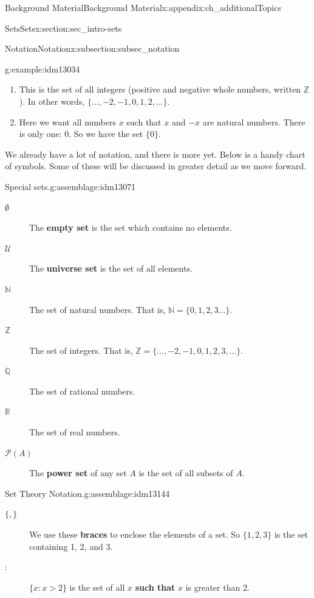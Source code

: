 \documentclass[oneside,10pt,]{book}
\newcommand{\terminology}[1]{\textbf{#1}}
\numberwithin{equation}{chapter}
\def\N{\mathbb N}
\def\Z{\mathbb Z}
\def\Q{\mathbb Q}
\def\R{\mathbb R}
\def\U{\mathcal U}
\def\pow{\mathcal P}
\def\st{:}
\begin{document}
\begin{appendixptx}{Background Material}{}{Background Material}{}{}{x:appendix:ch_additionalTopics}
\begin{sectionptx}{Sets}{}{Sets}{}{}{x:section:sec_intro-sets}
\begin{subsectionptx}{Notation}{}{Notation}{}{}{x:subsection:subsec_notation}
\begin{example}{}{g:example:idm13034}
\begin{enumerate}
\item{}This is the set of all integers  (positive and negative whole numbers, written \(\Z\)). In other words, \(\{\ldots, -2, -1, 0, 1, 2, \ldots\}\).%
\item{}Here we want all numbers \(x\) such that \(x\) and \(-x\) are natural numbers. There is only one: 0. So we have the set \(\{0\}\).%
\end{enumerate}
%
\end{example}
We already have a lot of notation, and there is more yet. Below is a handy chart of symbols. Some of these will be discussed in greater detail as we move forward.%
\begin{assemblage}{Special sets.}{g:assemblage:idm13071}%
%
\begin{description}
\item[{\(\emptyset\)}]The \terminology{empty set} is the set which contains no elements. \label{g:notation:idm13080}  %
\item[{\(\U\)}]The \terminology{universe set} is the set of all elements. \label{g:notation:idm13090}%
\item[{\(\N\)}]The set of natural numbers. That is, \(\N =
\{0, 1, 2, 3\ldots\}\).\label{g:notation:idm13098} %
\item[{\(\Z\)}]The set of integers. That is, \(\Z = \{\ldots, -2, -1, 0, 1, 2, 3, \ldots\}\).  \label{g:notation:idm13110}%
\item[{\(\Q\)}]The set of rational numbers.  \label{g:notation:idm13117} %
\item[{\(\R\)}]The set of real numbers.      \label{g:notation:idm13128}%
\item[{\(\pow(A)\)}]The \terminology{power set} of any set \(A\) is the set of all subsets of \(A\).\label{g:notation:idm13140}%
\end{description}
%
\end{assemblage}
\begin{assemblage}{Set Theory Notation.}{g:assemblage:idm13144}%
%
\begin{description}
\item[{\(\{, \}\)}]We use these \terminology{braces} to enclose the elements of a set. So \(\{1,2,3\}\) is the set containing 1, 2, and 3.\label{g:notation:idm13154}%
\item[{\(\st\)}]\(\{x \st x > 2\}\) is the set of all \(x\) \terminology{such that} \(x\) is greater than 2.\label{g:notation:idm13165}%

\end{description}
\end{assemblage}
\end{subsectionptx}
\end{sectionptx}
\end{appendixptx}
\end{document}
